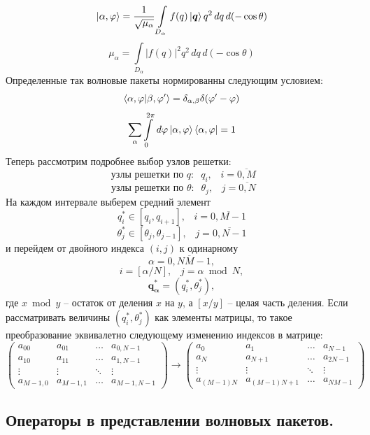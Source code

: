 \documentclass[a4paper,12pt]{article}
\newcommand{\vect}[1]{\boldsymbol{#1}}
\begin{document}
\[
	\ket{\alpha,\varphi} = \frac{1}{\sqrt{\mu_\alpha}} \int\limits_{D_\alpha} f(q) \ket{\vect{q}} q^2 \,dq \,d(-\cos\theta)
\]
\[
	\mu_\alpha =  \int\limits_{D_\alpha} |f(q)|^2 q^2 \,dq \,d(-\cos\theta)
\]
Определенные так волновые пакеты нормированны следующим условием:
\[
	\braket{\alpha,\varphi|\beta,\varphi'} = \delta_{\alpha,\beta}\delta(\varphi'-\varphi)
\]\[
	\sum\limits_\alpha \int\limits_0^{2\pi} \,d \varphi \ket{\alpha,\varphi}\bra{\alpha,\varphi} = 1
\]
Теперь рассмотрим подробнее выбор узлов решетки:
\[
 \text{ узлы решетки по }q: \;\; q_i, \;\;\; i=\overline{0,M}
\]\[
 \text{ узлы решетки по }\theta: \;\;  \theta_j, \;\;\; j=\overline{0,N}
\]
На каждом интервале выберем средний элемент
\[
 q_i^* \in [q_i,q_{i+1}], \;\;\; i=\overline{0,M-1}
\]\[
 \theta_j^* \in [\theta_j,\theta_{j-1}], \;\;\; j=\overline{0,N-1}
\]
и перейдем от двойного индекса $(i,j)$ к одинарному
\[
	\alpha = \overline{0,N M-1},
\]\[
	i = [\alpha/N], \;\;\; j = \alpha \bmod N,
\]\[
	\vect{q^*_\alpha} = (q_i^*,\theta_j^*),
\]
где $x \bmod y$ – остаток от деления $x$ на $y$, а $[x/y]$ – целая часть деления. Если рассматривать величины $(q_i^*,\theta_j^*)$ как элементы матрицы, то такое преобразование эквивалетно следующему изменению индексов в матрице:
\[
\begin{pmatrix} 
a_{00}    & a_{01}    & \dots  & a_{0,N-1}  \\ 
a_{10}    & a_{11}    & \dots  & a_{1,N-1}  \\ 
\vdots    & \vdots    & \ddots & \vdots     \\ 
a_{M-1,0} & a_{M-1,1} & \dots  & a_{M-1,N-1}  
\end{pmatrix}  \longrightarrow  \begin{pmatrix} 
a_{0}      & a_{1}        & \dots   & a_{N-1}  \\  
a_{N}      & a_{N+1}      & \dots   & a_{2N-1} \\ 
\vdots     & \vdots       & \ddots  & \vdots   \\
a_{(M-1)N} & a_{(M-1)N+1} & \dots   & a_{NM-1} 
\end{pmatrix}
\]
\newline
\subsection{Операторы в представлении волновых пакетов.}
\end{document}
